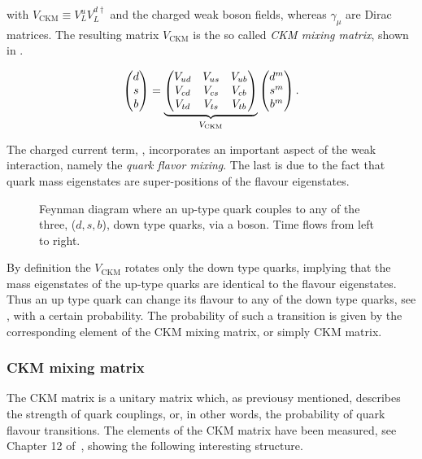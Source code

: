 \noindent with $V_{\text{CKM}} \equiv V^u_LV^{d\dagger}_L$ and \Wpm the charged weak boson fields, whereas $\gamma_\mu$ are Dirac matrices.
The resulting matrix $V_{\text{CKM}}$ is the so called {\it CKM mixing matrix}, shown in .

\begin{equation}
  \centering
  \begin{pmatrix} \dquark \\ \squark \\ \bquark  \end{pmatrix} =
  \underbrace{\begin{pmatrix} \Vud & \Vus & \Vub \\ \Vcd & \Vcs & \Vcb \\ \Vtd & \Vts & \Vtb \end{pmatrix}}_{V_{\text{CKM}}}
    \begin{pmatrix} \dquark^m \\ \squark^m \\ \bquark^m  \end{pmatrix}.
      \label{quark_field_rotation}
  \end{equation}

The charged current term, , incorporates an important aspect of the weak interaction,
namely the {\it quark flavor mixing}. The last is due to the fact that quark mass eigenstates are super-positions
of the flavour eigenstates.

\begin{figure}[h!]
  \centering
  {\sffamily }
  \caption{Feynman diagram where an up-type quark couples to any of the three, ($d,s,b$), down type quarks,
           via a \Wp boson. Time flows from left to right.}
  \label{QuarkMixing}
\end{figure}

\noindent By definition the $V_{\text{CKM}}$ rotates only the down type quarks, implying that
the mass eigenstates of the up-type quarks are identical to the flavour eigenstates. Thus an up type quark
can change its flavour to any of the down type quarks, see , with a certain probability.
The probability of such a transition is given by the corresponding element of the CKM mixing matrix, or simply CKM matrix.

\subsubsection{CKM mixing matrix}
The CKM matrix is a unitary matrix which, as previousy mentioned, describes the strength of quark couplings,
or, in other words, the probability of quark flavour transitions. The elements of the CKM matrix have been measured, see \eg Chapter 12 of~\cite{PDG},
showing the following interesting structure.

